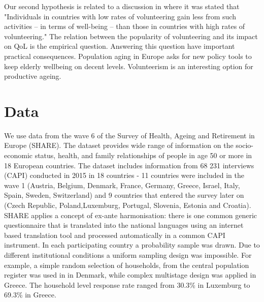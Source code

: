 \documentclass[10pt, letterpaper]{article}
\begin{document}
\begin{spacing}{1.4}
Our second hypothesis is related to a discussion in \citet{plagnol10} where it was stated that "Individuals in countries with low rates 
of volunteering gain less from such activities – in terms of well-being – than those in countries with high rates of volunteering." The relation between the popularity of volunteering and its impact on QoL is the empirical question. Answering this question have important practical consequences. Population aging in Europe asks for new policy tools to keep elderly wellbeing on decent levels. Volunteerism is an interesting option for productive ageing. 
 


\section{Data}

We use data from the wave 6 of the Survey of Health, Ageing and Retirement in Europe (SHARE). The dataset provides wide range of information on the socio-economic status, health, and family relationships of people in age 50 or more in 18 European countries. The dataset includes information from 68 231 interviews (CAPI) conducted in 2015 in 18 countries - 11 countries were included in the wave 1 (Austria, Belgium, Denmark, France, Germany, Greece, Israel, Italy, Spain, Sweden, Switzerland) and 9 countries that entered the survey later on (Czech Republic, Poland,Luxemburg,  Portugal, Slovenia, Estonia and Croatia). SHARE applies a concept of ex-ante harmonisation: there is one common generic questionnaire that is translated into the national languages using an internet based translation tool and processed automatically in a common CAPI instrument. In each participating country a probability sample was drawn. Due to different institutional conditions a uniform sampling design was impossible. For example, a simple random selection of households, from the central population register was used in in Denmark, while complex multistage design was applied in Greece. The  household level response rate ranged from 30.3\% in Luxemburg to 69.3\% in Greece. \citet{bergmann17} \\



\end{spacing}
\end{document}
